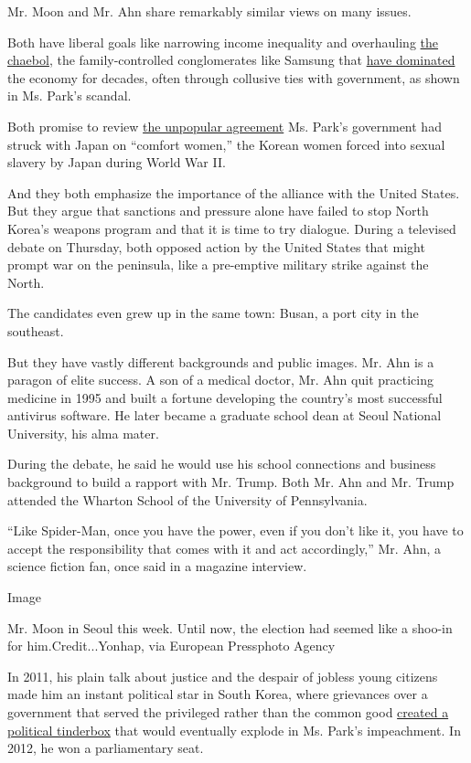 Mr. Moon and Mr. Ahn share remarkably similar views on many issues.

Both have liberal goals like narrowing income inequality and overhauling
\href{http://www.nytimes.com/2011/09/14/business/global/south-korean-chaebol-under-increasing-pressure.html}{the
chaebol}, the family-controlled conglomerates like Samsung that
\href{https://www.nytimes.com/2017/01/02/world/asia/south-korea-park-geun-hye-samsung.html}{have
dominated} the economy for decades, often through collusive ties with
government, as shown in Ms. Park's scandal.

Both promise to review
\href{https://www.nytimes.com/2015/12/29/world/asia/comfort-women-south-korea-japan.html}{the
unpopular agreement} Ms. Park's government had struck with Japan on
``comfort women,'' the Korean women forced into sexual slavery by Japan
during World War II.

And they both emphasize the importance of the alliance with the United
States. But they argue that sanctions and pressure alone have failed to
stop North Korea's weapons program and that it is time to try dialogue.
During a televised debate on Thursday, both opposed action by the United
States that might prompt war on the peninsula, like a pre-emptive
military strike against the North.

The candidates even grew up in the same town: Busan, a port city in the
southeast.

But they have vastly different backgrounds and public images. Mr. Ahn is
a paragon of elite success. A son of a medical doctor, Mr. Ahn quit
practicing medicine in 1995 and built a fortune developing the country's
most successful antivirus software. He later became a graduate school
dean at Seoul National University, his alma mater.

During the debate, he said he would use his school connections and
business background to build a rapport with Mr. Trump. Both Mr. Ahn and
Mr. Trump attended the Wharton School of the University of Pennsylvania.

``Like Spider-Man, once you have the power, even if you don't like it,
you have to accept the responsibility that comes with it and act
accordingly,'' Mr. Ahn, a science fiction fan, once said in a magazine
interview.

Image

Mr. Moon in Seoul this week. Until now, the election had seemed like a
shoo-in for him.Credit...Yonhap, via European Pressphoto Agency

In 2011, his plain talk about justice and the despair of jobless young
citizens made him an instant political star in South Korea, where
grievances over a government that served the privileged rather than the
common good
\href{http://www.nytimes.com/2011/11/20/world/asia/a-new-voice-grips-south-korea-with-plain-talk-about-inequality-and-justice.html}{created
a political tinderbox} that would eventually explode in Ms. Park's
impeachment. In 2012, he won a parliamentary seat.

